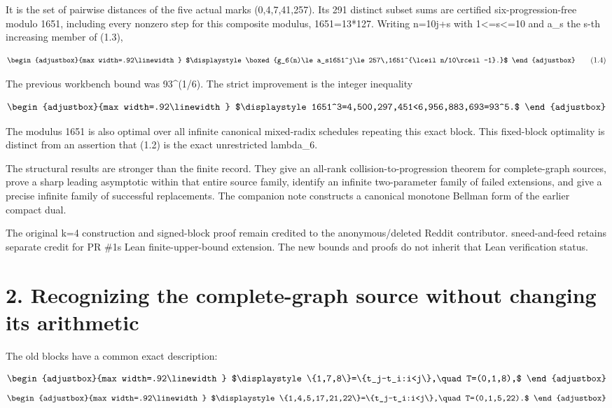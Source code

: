 It is the set of pairwise distances of the five actual marks (0,4,7,41,257). Its 291 distinct subset sums are certified six-progression-free modulo 1651, including every nonzero step for this composite modulus, 1651=13*127. Writing n=10j+s with 1\textless=s\textless=10 and a\_s the s-th increasing member of (1.3),

\[
\begin{adjustbox}{max width=.92\linewidth}
$\displaystyle \boxed{g_6(n)\le a_s1651^j\le257\,1651^{\lceil n/10\rceil-1}.}$
\end{adjustbox}
\tag{1.4}
\]

The previous workbench bound was 93\^{}(1/6). The strict improvement is the integer inequality

\[
\begin{adjustbox}{max width=.92\linewidth}
$\displaystyle 1651^3=4,500,297,451<6,956,883,693=93^5.$
\end{adjustbox}
\]

The modulus 1651 is also optimal over all infinite canonical mixed-radix schedules repeating this exact block. This fixed-block optimality is distinct from an assertion that (1.2) is the exact unrestricted lambda\_6.

The structural results are stronger than the finite record. They give an all-rank collision-to-progression theorem for complete-graph sources, prove a sharp leading asymptotic within that entire source family, identify an infinite two-parameter family of failed extensions, and give a precise infinite family of successful replacements. The companion note constructs a canonical monotone Bellman form of the earlier compact dual.

The original k=4 construction and signed-block proof remain credited to the anonymous/deleted Reddit contributor. sneed-and-feed retains separate credit for PR \#1\textquotesingle s Lean finite-upper-bound extension. The new bounds and proofs do not inherit that Lean verification status.

\section{2. Recognizing the complete-graph source without changing its arithmetic}\label{n08-recognizing-the-complete-graph-source-without-changing-its-arithmetic}

The old blocks have a common exact description:

\[
\begin{adjustbox}{max width=.92\linewidth}
$\displaystyle \{1,7,8\}=\{t_j-t_i:i<j\},\quad T=(0,1,8),$
\end{adjustbox}
\] \[
\begin{adjustbox}{max width=.92\linewidth}
$\displaystyle \{1,4,5,17,21,22\}=\{t_j-t_i:i<j\},\quad T=(0,1,5,22).$
\end{adjustbox}
\]

